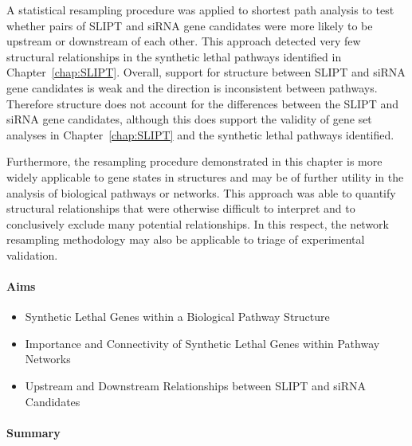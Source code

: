A statistical resampling procedure was applied to \gls{shortest path} analysis to test whether pairs of \gls{SLIPT} and \gls{siRNA} gene candidates were more likely to be upstream or downstream of each other. This approach detected very few structural relationships in the \gls{synthetic lethal} \glspl{pathway} identified in Chapter~\ref{chap:SLIPT}. Overall, support for  structure between \gls{SLIPT} and \gls{siRNA} gene candidates is weak and the direction is inconsistent between \glspl{pathway}. Therefore  structure does not account for the differences between the \gls{SLIPT} and \gls{siRNA} gene candidates, although this does support the validity of gene set analyses in Chapter~\ref{chap:SLIPT} and the \gls{synthetic lethal} \glspl{pathway} identified.

Furthermore, the resampling procedure demonstrated in this chapter is more widely applicable to gene states in  structures and may be of further utility in the analysis of biological \glspl{pathway} or networks. This approach was able to quantify structural relationships that were otherwise difficult to interpret and to conclusively exclude many potential relationships. In this respect, the network resampling methodology may also be applicable to triage of experimental validation.

\clearpage

\iffalse
\paragraph{Aims}

  \begin{itemize}
   \item Synthetic Lethal Genes within a Biological Pathway Structure
   
   \bigskip
   
   \item Importance and Connectivity of Synthetic Lethal Genes within Pathway Networks
   
   \bigskip
   
   \item Upstream and Downstream Relationships between SLIPT and \gls{siRNA} Candidates
  \end{itemize}

\paragraph{Summary}

